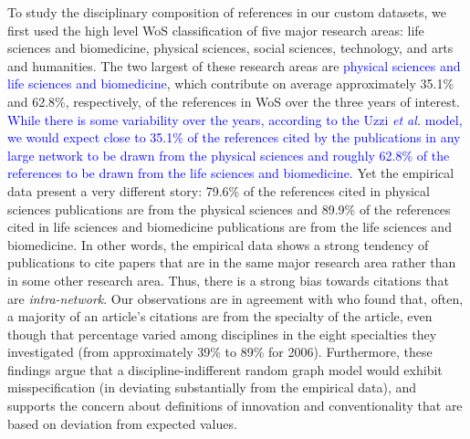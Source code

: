 \documentclass[NETN]{stjour}
\begin{document}

To study the disciplinary composition of references in our custom datasets, we first used the high level WoS classification of five major research areas: life sciences and biomedicine, physical sciences, social sciences, technology, and arts and humanities. The two largest of these research areas are \textcolor{blue}{physical sciences and life sciences and biomedicine}, which contribute on average approximately 35.1\% and 62.8\%, respectively, of the references in WoS over the three years of interest. \textcolor{blue}{While there is some variability over the years, according to the Uzzi  {\em et al.} model, we would expect close to 35.1\% of the references cited by the publications in any large network  to be drawn from the physical sciences and roughly 62.8\% of the references to be drawn from the life sciences and biomedicine.}
Yet the empirical data present a very different  story: 79.6\% of the references cited in physical sciences publications are from the physical sciences and 89.9\% of the references cited in life sciences and biomedicine publications are from the life sciences and biomedicine. In other words, the empirical data shows a strong tendency of publications to cite papers that are in the same major research area rather than in some other research area.  Thus, there is a strong bias towards citations that are {\em intra-network}. Our observations are in agreement with \cite{wallace_lariviere_gingras_2012} who found that, often, a majority of an article's citations are from the specialty of the article, even though that percentage varied among disciplines in the eight specialties they investigated (from approximately 39\% to 89\% for 2006). Furthermore, these findings argue that a discipline-indifferent random graph model would exhibit misspecification (in deviating substantially from the empirical data), and supports the  concern about definitions of  innovation and conventionality that are based on deviation from expected values. 
\end{document}
